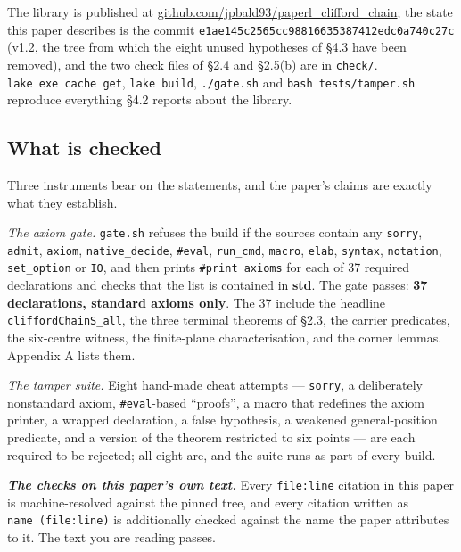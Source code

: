 \documentclass[11pt]{article}
\theoremstyle{definition}
\theoremstyle{remark}
\begin{document}
The library is published at \href{https://github.com/jpbald93/paperl_clifford_chain}{github.com/jpbald93/paperl\_clifford\_chain};
the state this paper describes is the commit \texttt{e1ae145c2565cc98816635387412edc0a740c27c} (v1.2, the tree
from which the eight unused hypotheses of \S{}4.3 have been removed), and the two check files of \S{}2.4 and
\S{}2.5(b) are in \texttt{check/\allowbreak }. \texttt{lake\ exe\ cache\ get}, \texttt{lake\ build}, \texttt{.\allowbreak /\allowbreak gate.\allowbreak sh} and
\texttt{bash\ tests/\allowbreak tamper.\allowbreak sh} reproduce everything \S{}4.2 reports about the library.

\hypertarget{what-is-checked}{%
\subsection{What is checked}\label{what-is-checked}}

Three instruments bear on the statements, and the paper's claims are exactly what they establish.

\emph{The axiom gate.} \texttt{gate.\allowbreak sh} refuses the build if the sources contain any \texttt{sorry}, \texttt{admit}, \texttt{axiom},
\texttt{native\_\allowbreak decide}, \texttt{\#eval}, \texttt{run\_\allowbreak cmd}, \texttt{macro}, \texttt{elab}, \texttt{syntax}, \texttt{notation}, \texttt{set\_\allowbreak option} or \texttt{IO}, and then
prints \texttt{\#print\ axioms} for each of 37 required declarations and checks that the list is contained in
\textbf{std}. The gate passes: \textbf{37 declarations, standard axioms only}. The 37 include the headline
\texttt{cliffordChainS\_\allowbreak all}, the three terminal theorems of \S{}2.3, the carrier predicates, the six-centre witness,
the finite-plane characterisation, and the corner lemmas. Appendix A lists them.

\emph{The tamper suite.} Eight hand-made cheat attempts --- \texttt{sorry}, a deliberately nonstandard axiom,
\texttt{\#eval}-based ``proofs'', a macro that redefines the axiom printer, a wrapped declaration, a false
hypothesis, a weakened general-position predicate, and a version of the theorem restricted to six points ---
are each required to be rejected; all eight are, and the suite runs as part of every build.

\textbf{\emph{The checks on this paper's own text.}} Every \texttt{file\allowbreak :line} citation in this paper is machine-resolved
against the pinned tree, and every citation written as \texttt{\textasciigrave{}name\textasciigrave{}\ (\textasciigrave{}file:line\textasciigrave{})} is additionally checked
against the name the paper attributes to it. The text you are reading passes.
\end{document}
